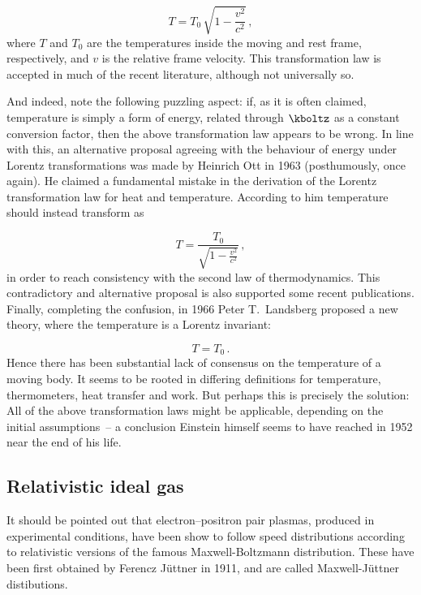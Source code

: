 \documentclass{scrartcl}
\begin{document}
\begin{equation*}\label{reltemplower}
  T = T_0\,\sqrt{1-\frac{v^2}{c^2}}\,,
\end{equation*}
%
where $T$ and $T_0$ are the temperatures inside the moving and rest frame, respectively, and $v$ is the relative frame velocity. This transformation law is accepted in much of the recent literature, although not universally so.

And indeed, note the following puzzling aspect: if, as it is often claimed, temperature is simply a form of energy, related through $\kboltz$ as a constant conversion factor, then the above transformation law appears to be wrong. In line with this, an alternative proposal agreeing with the behaviour of energy under Lorentz transformations was made by Heinrich Ott in 1963 (posthumously, once again). He claimed a fundamental mistake in the derivation of the Lorentz transformation law for heat and temperature. According to him temperature should instead transform as

\begin{equation*}\label{reltemphigher}
  T = \frac{T_0}{\sqrt{1-\frac{v^2}{c^2}}}\,,
\end{equation*}
%
in order to reach consistency with the second law of thermodynamics. This contradictory and alternative proposal is also supported some recent publications. Finally, completing the confusion, in 1966 Peter T.\ Landsberg proposed a new theory, where the temperature is a Lorentz invariant:

\begin{equation*}\label{reltempequal}
  T = T_0\,.
\end{equation*}
%
Hence there has been substantial lack of consensus on the temperature of a moving body. It seems to be rooted in differing definitions for temperature, thermometers, heat transfer and work. But perhaps this is precisely the solution: All of the above transformation laws might be applicable, depending on the initial assumptions~-- a conclusion Einstein himself seems to have reached in 1952 near the end of his life.


\subsection*{Relativistic ideal gas}

It should be pointed out that electron–positron pair plasmas, produced in experimental conditions, have been show to follow speed distributions according to relativistic versions of the famous Maxwell-Boltzmann distribution. These have been first obtained by Ferencz Jüttner in 1911, and are called Maxwell-Jüttner distibutions.
\end{document}
